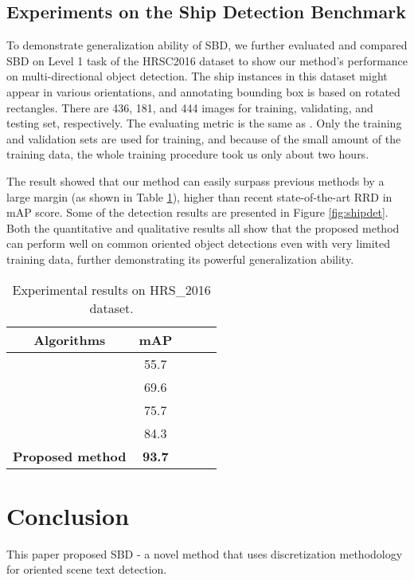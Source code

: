 \documentclass{article}
\begin{document}
\subsection{Experiments on the Ship Detection Benchmark}
To demonstrate generalization ability of SBD, we further evaluated and compared SBD on Level 1 task of the HRSC2016 dataset \cite{liu2017rotated} to show our method's performance on multi-directional object detection. The ship instances in this dataset might appear in various orientations, and annotating bounding box is based on rotated rectangles. There are 436, 181, and 444 images for training, validating, and testing set, respectively. The evaluating metric is the same as \cite{karatzas2015icdar}. Only the training and validation sets are used for training, and because of the small amount of the training data, the whole training procedure took us only about two hours.

The result showed that our method can easily surpass previous methods by a large margin (as shown in Table \ref{tab:hrsc}),  higher than recent state-of-the-art RRD \cite{liao2018rotation} in mAP score. Some of the detection results are presented in Figure \ref{fig:shipdet}. Both the quantitative and qualitative results all show that the proposed method can perform well on common oriented object detections even with very limited training data, further demonstrating its powerful generalization ability.

\begin{table}[!t]
\centering
\small
\begin{tabular}{c|cccc}
  \hline
  Algorithms  & mAP \\
  \hline
  \cite{girshick2015fast,liao2018rotation} & 55.7\\
  \cite{girshick2015fast,liao2018rotation} & 69.6 \\
  \cite{girshick2015fast,liao2018rotation} & 75.7\\
  \cite{liao2018rotation} & 84.3 \\
  \hline
  {\bf Proposed method} &  {\bf 93.7} \\
  \hline
\end{tabular}
\caption{Experimental results on HRS\_2016 dataset. }
\label{tab:hrsc}
\end{table}


\section{Conclusion}
This paper proposed SBD - a novel method that uses discretization methodology for oriented scene text detection.
\end{document}
